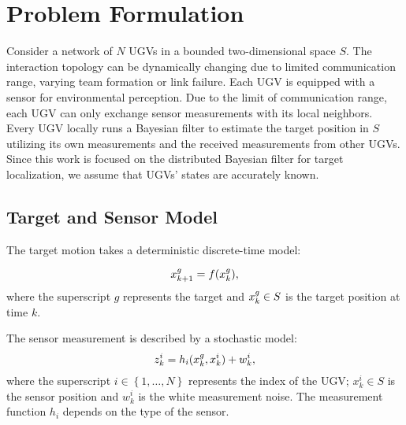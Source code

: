 \section{Problem Formulation}\label{sec:prob}
	Consider a network of $N$ UGVs in a bounded two-dimensional space $S$. 
	The interaction topology can be dynamically changing due to limited communication range, varying team formation or link failure.
	Each UGV is equipped with a sensor for environmental perception. 
	Due to the limit of communication range, each UGV can only exchange sensor measurements with its local neighbors. 
	Every UGV locally runs a Bayesian filter to estimate the target position in $S$ utilizing its own measurements and the received measurements from other UGVs. 
	Since this work is focused on the distributed Bayesian filter for target localization, we assume that UGVs' states are accurately known.
	
	\subsection{Target and Sensor Model}
	The target motion takes a deterministic discrete-time model: %
	
	\begin{equation}
		\small
		\label{eqn:tar_motion_model}
		\xg_{k+1}=f(\xg_k), %
	\end{equation}\normalsize
	where the superscript $g$ represents the target and $x^g_k\in S$ is the target position at time $k$. %
	
	The sensor measurement is described by a stochastic model:
	\begin{equation}\label{eqn:meas_model}
		z^i_k = h_i(x^g_k,x^i_k)+w^i_k,
	\end{equation}
	where the superscript $i\in\left\lbrace 1,\dots,N\right\rbrace$ represents the index of the UGV; $x^i_k\in S$ is the sensor position and $w^i_k$ is the white measurement noise.
	The measurement function $h_i$ depends on the type of the sensor. 
	
